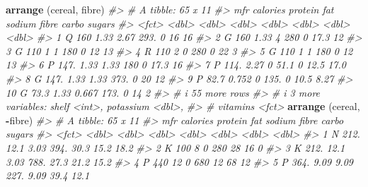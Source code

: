 \documentclass[
]{book}
\newenvironment{Shaded}{\begin{snugshade}}{\end{snugshade}}
\newcommand{\CommentTok}[1]{\textcolor[rgb]{0.56,0.35,0.01}{\textit{#1}}}
\newcommand{\FunctionTok}[1]{\textcolor[rgb]{0.13,0.29,0.53}{\textbf{#1}}}
\newcommand{\NormalTok}[1]{#1}
\newcommand{\SpecialCharTok}[1]{\textcolor[rgb]{0.81,0.36,0.00}{\textbf{#1}}}
\begin{document}
\begin{Shaded}
\begin{Highlighting}[]
\FunctionTok{arrange}\NormalTok{ (cereal, fibre)}
\CommentTok{\#\textgreater{} \# A tibble: 65 x 11}
\CommentTok{\#\textgreater{}    mfr   calories protein   fat sodium fibre carbo sugars}
\CommentTok{\#\textgreater{}    \textless{}fct\textgreater{}    \textless{}dbl\textgreater{}   \textless{}dbl\textgreater{} \textless{}dbl\textgreater{}  \textless{}dbl\textgreater{} \textless{}dbl\textgreater{} \textless{}dbl\textgreater{}  \textless{}dbl\textgreater{}}
\CommentTok{\#\textgreater{}  1 Q        160     1.33  2.67   293.      0  16    16   }
\CommentTok{\#\textgreater{}  2 G        160     1.33  4      280       0  17.3  12   }
\CommentTok{\#\textgreater{}  3 G        110     1     1      180       0  12    13   }
\CommentTok{\#\textgreater{}  4 R        110     2     0      280       0  22     3   }
\CommentTok{\#\textgreater{}  5 G        110     1     1      180       0  12    13   }
\CommentTok{\#\textgreater{}  6 P        147.    1.33  1.33   180       0  17.3  16   }
\CommentTok{\#\textgreater{}  7 P        114.    2.27  0       51.1     0  12.5  17.0 }
\CommentTok{\#\textgreater{}  8 G        147.    1.33  1.33   373.      0  20    12   }
\CommentTok{\#\textgreater{}  9 P         82.7   0.752 0      135.      0  10.5   8.27}
\CommentTok{\#\textgreater{} 10 G         73.3   1.33  0.667  173.      0  14     2   }
\CommentTok{\#\textgreater{} \# i 55 more rows}
\CommentTok{\#\textgreater{} \# i 3 more variables: shelf \textless{}int\textgreater{}, potassium \textless{}dbl\textgreater{},}
\CommentTok{\#\textgreater{} \#   vitamins \textless{}fct\textgreater{}}
\FunctionTok{arrange}\NormalTok{ (cereal, }\SpecialCharTok{{-}}\NormalTok{fibre)}
\CommentTok{\#\textgreater{} \# A tibble: 65 x 11}
\CommentTok{\#\textgreater{}    mfr   calories protein   fat sodium fibre carbo sugars}
\CommentTok{\#\textgreater{}    \textless{}fct\textgreater{}    \textless{}dbl\textgreater{}   \textless{}dbl\textgreater{} \textless{}dbl\textgreater{}  \textless{}dbl\textgreater{} \textless{}dbl\textgreater{} \textless{}dbl\textgreater{}  \textless{}dbl\textgreater{}}
\CommentTok{\#\textgreater{}  1 N         212.   12.1   3.03   394. 30.3   15.2  18.2 }
\CommentTok{\#\textgreater{}  2 K         100     8     0      280  28     16     0   }
\CommentTok{\#\textgreater{}  3 K         212.   12.1   3.03   788. 27.3   21.2  15.2 }
\CommentTok{\#\textgreater{}  4 P         440    12     0      680  12     68    12   }
\CommentTok{\#\textgreater{}  5 P         364.    9.09  9.09   227.  9.09  39.4  12.1 }

\end{Highlighting}
\end{Shaded}
\end{document}
